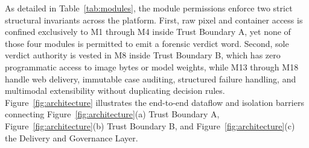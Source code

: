 \documentclass[final,5p,times,twocolumn,numafflabel]{elsarticle}
\begin{document}
As detailed in Table~\ref{tab:modules}, the module permissions enforce two strict structural invariants across the platform. First, raw pixel and container access is confined exclusively to M1 through M4 inside Trust Boundary A, yet none of those four modules is permitted to emit a forensic verdict word. Second, sole verdict authority is vested in M8 inside Trust Boundary B, which has zero programmatic access to image bytes or model weights, while M13 through M18 handle web delivery, immutable case auditing, structured failure handling, and multimodal extensibility without duplicating decision rules. Figure~\ref{fig:architecture} illustrates the end-to-end dataflow and isolation barriers connecting Figure~\ref{fig:architecture}(a) Trust Boundary A, Figure~\ref{fig:architecture}(b) Trust Boundary B, and Figure~\ref{fig:architecture}(c) the Delivery and Governance Layer.
\end{document}
